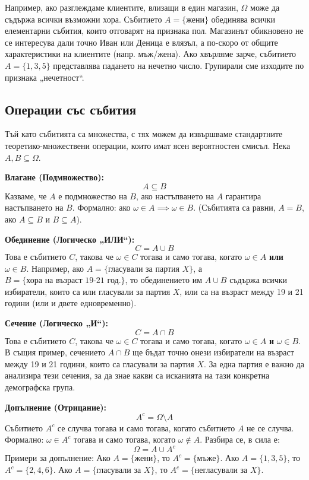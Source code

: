 Например, ако разглеждаме клиентите, влизащи в един магазин, $\Omega$ може да съдържа всички възможни хора. Събитието $A = \{\text{жени}\}$ обединява всички елементарни събития, които отговарят на признака пол. Магазинът обикновено не се интересува дали точно Иван или Деница е влязъл, а по-скоро от общите характеристики на клиентите (напр. мъж/жена).
Ако хвърляме зарче, събитието $A = \{ 1, 3, 5 \}$ представлява падането на нечетно число. Групирали сме изходите по признака „нечетност“.

\subsection{Операции със събития}

Тъй като събитията са множества, с тях можем да извършваме стандартните теоретико-множествени операции, които имат ясен вероятностен смисъл. Нека $A, B \subseteq \Omega$.

\textbf{Влагане (Подмножество):}
\[
A \subseteq B
\]
Казваме, че $A$ е подмножество на $B$, ако настъпването на $A$ гарантира настъпването на $B$. Формално: ако $\omega \in A \implies \omega \in B$. (Събитията са равни, $A = B$, ако $A \subseteq B$ и $B \subseteq A$).

\textbf{Обединение (Логическо „ИЛИ“):}
\[
C = A \cup B
\]
Това е събитието $C$, такова че $\omega \in C$ тогава и само тогава, когато $\omega \in A$ \textbf{или} $\omega \in B$.
Например, ако $A = \{\text{гласували за партия } X\}$, а $B = \{\text{хора на възраст 19-21 год.}\}$, то обединението им $A \cup B$ съдържа всички избиратели, които са или гласували за партия $X$, или са на възраст между 19 и 21 години (или и двете едновременно).

\textbf{Сечение (Логическо „И“):}
\[
C = A \cap B
\]
Това е събитието $C$, такова че $\omega \in C$ тогава и само тогава, когато $\omega \in A$ \textbf{и} $\omega \in B$.
В същия пример, сечението $A \cap B$ ще бъдат точно онези избиратели на възраст между 19 и 21 години, които са гласували за партия $X$. За една партия е важно да анализира тези сечения, за да знае какви са исканията на тази конкретна демографска група.

\textbf{Допълнение (Отрицание):}
\[
A^c = \Omega \setminus A
\]
Събитието $A^c$ се случва тогава и само тогава, когато събитието $A$ не се случва. Формално: $\omega \in A^c$ тогава и само тогава, когато $\omega \notin A$.
Разбира се, в сила е:
\[
\Omega = A \cup A^c
\]
Примери за допълнение:
Ако $A = \{\text{жени}\}$, то $A^c = \{\text{мъже}\}$.
Ако $A = \{1, 3, 5\}$, то $A^c = \{2, 4, 6\}$.
Ако $A = \{\text{гласували за } X\}$, то $A^c = \{\text{негласували за } X\}$.

